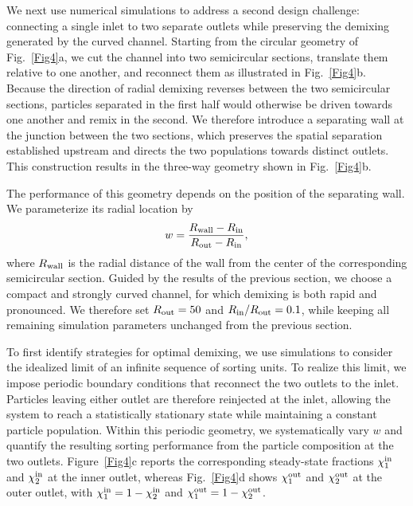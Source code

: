 \documentclass[aps,pre,twocolumn,amsmath,amssymb,notitlepage,superscriptaddress,longbibliography,nofootinbib,10pt]{revtex4-1}
\begin{document}
We next use numerical simulations to address a second design challenge: connecting a single inlet to two separate outlets while preserving the demixing generated by the curved channel. Starting from the circular geometry of Fig.~\ref{Fig4}a, we cut the channel into two semicircular sections, translate them relative to one another, and reconnect them as illustrated in Fig.~\ref{Fig4}b. Because the direction of radial demixing reverses between the two semicircular sections, particles separated in the first half would otherwise be driven towards one another and remix in the second. We therefore introduce a separating wall at the junction between the two sections, which preserves the spatial separation established upstream and directs the two populations towards distinct outlets. This construction results in the three-way geometry shown in Fig.~\ref{Fig4}b.

The performance of this geometry depends on the position of the separating wall. We parameterize its radial location by
\begin{equation}
w=\frac{R_{\rm wall}-R_{\rm in}}{R_{\rm out}-R_{\rm in}},
\end{equation}
where $R_{\rm wall}$ is the radial distance of the wall from the center of the corresponding semicircular section. Guided by the results of the previous section, we choose a compact and strongly curved channel, for which demixing is both rapid and pronounced. We therefore set $R_{\rm out}=50$ and $R_{\rm in}/R_{\rm out}=0.1$, while keeping all remaining simulation parameters unchanged from the previous section.

To first identify strategies for optimal demixing, we use simulations to consider the idealized limit of an infinite sequence of sorting units. To realize this limit, we impose periodic boundary conditions that reconnect the two outlets to the inlet. Particles leaving either outlet are therefore reinjected at the inlet, allowing the system to reach a statistically stationary state while maintaining a constant particle population. Within this periodic geometry, we systematically vary $w$ and quantify the resulting sorting performance from the particle composition at the two outlets. Figure~\ref{Fig4}c reports the corresponding steady-state fractions $\chi^{\rm in}_{1}$ and $\chi^{\rm in}_{2}$ at the inner outlet, whereas Fig.~\ref{Fig4}d shows $\chi^{\rm out}_{1}$ and $\chi^{\rm out}_{2}$ at the outer outlet, with
$\chi^{\rm in}_{1}=1-\chi^{\rm in}_{2}$ and
$\chi^{\rm out}_{1}=1-\chi^{\rm out}_{2}$.
\end{document}
